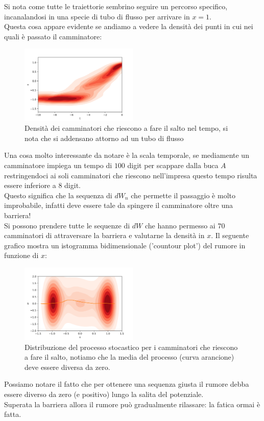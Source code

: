 \noindent 
Si nota come tutte le traiettorie sembrino seguire un percorso specifico, incanalandosi in una specie di tubo di flusso per arrivare in $x=1$. \\
Questa cosa appare evidente se andiamo a vedere la densità dei punti in cui nei quali è passato il camminatore:
\begin{figure}[H]
    \centering
    \includegraphics[width=0.5\textwidth]{figures/lez_12_walker_t.png}
    \caption{\scriptsize Densità dei camminatori che riescono a fare il salto nel tempo, si nota che si addensano attorno ad un tubo di flusso}
    \label{fig:figures-lez_12_walker_t-png-}
\end{figure}
\noindent 
Una cosa molto interessante da notare è la scala temporale, se mediamente un camminatore impiega un tempo di $100$ digit per scappare dalla buca $A$ restringendoci ai soli camminatori che riescono nell'impresa questo tempo risulta essere inferiore a $8$ digit. \\
Questo significa che la sequenza di $dW_n$ che permette il passaggio è molto improbabile, infatti deve essere tale da spingere il camminatore oltre una barriera!\\
Si possono prendere tutte le sequenze di $dW$ che hanno permesso ai $70$ camminatori di attraversare la barriera e valutarne la densità in $x$. Il seguente grafico mostra un istogramma bidimensionale ('countour plot') del rumore in funzione di $x$:
\begin{figure}[H]
    \centering
    \includegraphics[width=0.5\textwidth]{figures/lez_12_dist.png}
    \caption{\scriptsize Distribuzione del processo stocastico per i camminatori che riescono a fare il salto, notiamo che la media del processo (curva arancione) deve essere diversa da zero.}
    \label{fig:figures-lez_12_dist-png}
\end{figure}
\noindent
Possiamo notare il fatto che per ottenere una sequenza giusta il rumore debba essere diverso da zero (e positivo) lungo la salita del potenziale. \\
Superata la barriera allora il rumore può gradualmente rilassare: la fatica ormai è fatta. 

